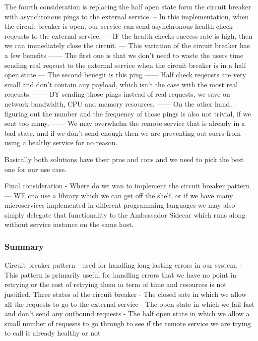 \documentclass[a4paper, 11pt]{book}
\begin{document}
{    The fourth consideration is replacing the half open state form the circuit breaker with asynchronous pings to the external service.
    -- In this implementation, when the circuit breaker is open, our service can send asynchronous health check reqeusts to the external service.
    --- IF the health checks success rate is high, then we can immediately close the circuit.
    --- This variation of the circuit breaker has a few benefits
    ------ The first one is that we don't need to waste the users time sending real reqeust to the external service when the circuit breaker is in a half open state
    --- The second benegit is this ping
    ------ Half check reqeusts are very small and don't contain any payload, which isn't the case with the most real reqeusts.
    ------ BY sending those pings instead of real requests, we save on network bandwidth, CPU and memory resources.
    ------ On the other hand, figuring out the number and the frequency of those pings is also not trivial, if we sent too many.
    ------ We may overwhelm the remote service that is already in a bad state, and if we don't send enough then we are preventing out suers from using a healthy service for no reason.

    Basically both solutions have their pros and cons and we need to pick the best one for our use case.

    Final consideration - Where do we wan to implement the circuit breaker pattern.
    --- WE cna use a library which we can get off the shelf, or if we have many microservices implemented in different programming languages we may also simply delegate that functionality to the Ambassador Sidecar which runs along without service instance on the same host.

    \subsubsection{Summary}
    Circuit breaker pattern - used for handling long lasting errors in our system.
    - This pattern is primarily useful for handling errors that we have no point in retrying or the cost of retrying them in term of time and resources is not justified.
    Three states of the circuit breaker
    - The closed sate in which we allow all the requests to go to the external service
    - The open state in which we fail fast and don't send any outbound requests
    - The half open state in which we allow a small number of requests to go through to see if the remote service we are trying to call is already healthy or not

}
\end{document}
